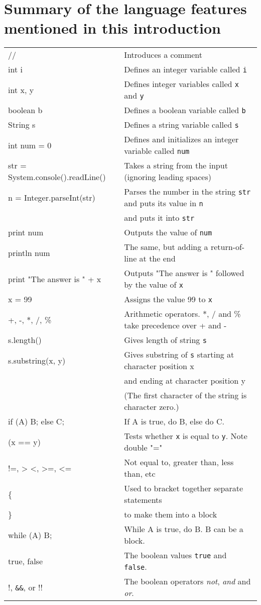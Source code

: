 \section{Summary of the language features mentioned in this introduction}

\begin{tabular}{@{\ttfamily}l l}
// & Introduces a comment\\
int i & Defines an integer variable called \texttt{i}\\
int x, y & Defines integer variables called \texttt{x} and \texttt{y}\\
boolean b & Defines a boolean variable called \texttt{b}\\
String s & Defines a string variable called \texttt{s}\\
int num = 0 & Defines and initializes an integer variable called \texttt{num}\\
str = System.console().readLine() & Takes a string from the input
(ignoring leading spaces) \\
n = Integer.parseInt(str) & Parses the number in the string
\texttt{str} and puts its value in \texttt{n} \\
& and puts it into \texttt{str}\\
print num & Outputs the value of \texttt{num}\\
println num & The same, but adding a return-of-line at the end\\
print "The answer is " + x & Outputs "The answer is " followed by the value of \texttt{x}\\
x = 99 & Assigns the value 99 to \texttt{x}\\
+, -, *, /, \% & Arithmetic operators.  *, / and \% take precedence over + and -\\
s.length() & Gives length of string \texttt{s}\\
s.substring(x, y) & Gives substring of \texttt{s} starting at character position x \\
& and ending at character position y\\
 & (The first character of the string is character zero.)\\
if (A) B; else C; & If A is true, do B, else do C.\\
(x == y) & Tests whether \texttt{x} is equal to \texttt{y}.  Note double "="\\
!=, > <, >=, <= & Not equal to, greater than, less than, etc\\
\{ & Used to bracket together separate statements\\
\} & to make them into a block\\
while (A) B; & While A is true, do B.  B can be a block.\\
true, false & The boolean values \texttt{true} and\texttt{ false}.\\
!, \verb+&&+, or !!  & The boolean operators \emph{not}, \emph{and} and \emph{or}.\\
\end{tabular}
\vspace*{5pt}


